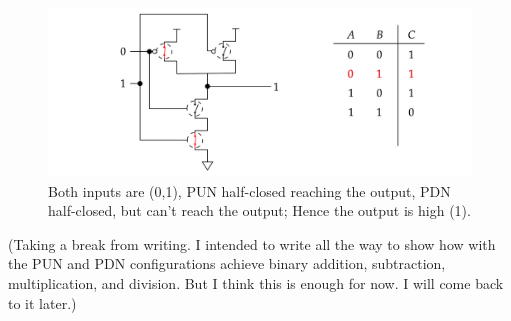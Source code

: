\begin{figure}[ht!]
  \centering
  \includegraphics[width=\textwidth]{Sections/circuits/nand_2.png}
  \caption{Both inputs are (0,1), PUN half-closed reaching the output, PDN half-closed, but can't reach the output; Hence the output is high (1).}
  \label{fig:nand-2}
\end{figure}

\newpage 

\noindent
(Taking a break from writing. I intended to write all the way to show 
how with the PUN and PDN configurations achieve binary addition, subtraction, multiplication, and division.
But I think this is enough for now. I will come back to it later.)